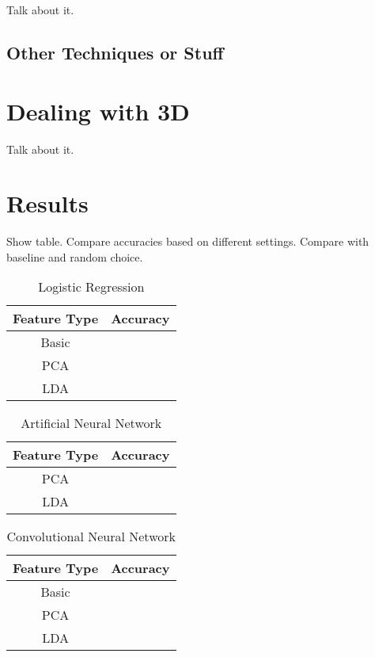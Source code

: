 \documentclass{article} %
\begin{document}
Talk about it.

\subsection{Other Techniques or Stuff}

\section{Dealing with 3D}

Talk about it.

\section{Results}
Show table. Compare accuracies based on different settings. Compare with baseline and random choice.
\begin{table}[h]
\centering
\caption{Logistic Regression}
\label{my-label}
\begin{tabular}{|c|c|}
\hline
\textbf{Feature Type} & \textbf{Accuracy} \\ \hline
Basic                 &                   \\ \hline
PCA                   &                   \\ \hline
LDA                   &                   \\ \hline
\end{tabular}
\end{table}

\begin{table}[h]
\centering
\caption{Artificial Neural Network}
\label{my-label}
\begin{tabular}{|c|c|}
\hline
\textbf{Feature Type} & \textbf{Accuracy} \\ \hline
PCA                   &                   \\ \hline
LDA                   &                   \\ \hline
\end{tabular}
\end{table}

\begin{table}[h]
\centering
\caption{Convolutional Neural Network}
\label{my-label}
\begin{tabular}{|c|c|}
\hline
\textbf{Feature Type} & \textbf{Accuracy} \\ \hline
Basic                 &                   \\ \hline
PCA                   &                   \\ \hline
LDA                   &                   \\ \hline
\end{tabular}
\end{table}
\end{document}
